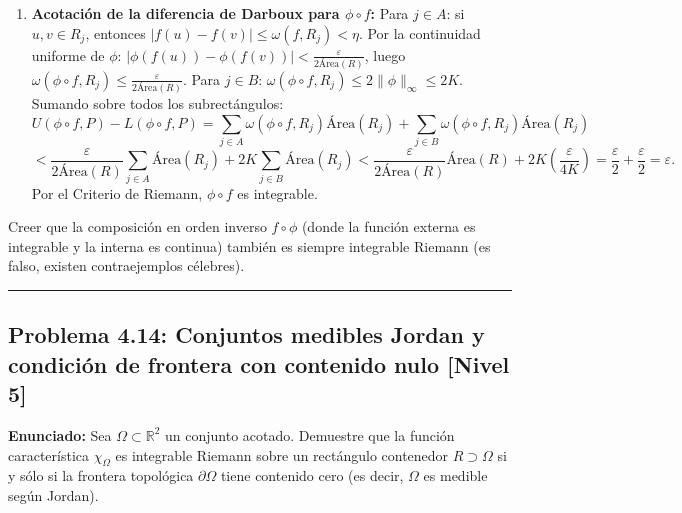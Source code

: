 \documentclass[11pt,a4paper]{article}
\begin{document}
\begin{enumerate}[label=\textbf{\arabic*.}]
\item \textbf{Acotación de la diferencia de Darboux para $\phi \circ f$:}
Para $j \in A$: si $u, v \in R_j$, entonces $|f(u) - f(v)| \le \omega(f, R_j) < \eta$.
Por la continuidad uniforme de $\phi$: $|\phi(f(u)) - \phi(f(v))| < \frac{\varepsilon}{2\text{Área}(R)}$, luego $\omega(\phi \circ f, R_j) \le \frac{\varepsilon}{2\text{Área}(R)}$.
Para $j \in B$: $\omega(\phi \circ f, R_j) \le 2\|\phi\|_\infty \le 2K$.
Sumando sobre todos los subrectángulos:
\begin{equation*}
U(\phi \circ f, P) - L(\phi \circ f, P) = \sum_{j \in A} \omega(\phi \circ f, R_j)\text{Área}(R_j) + \sum_{j \in B} \omega(\phi \circ f, R_j)\text{Área}(R_j)
\end{equation*}
\begin{equation*}
< \frac{\varepsilon}{2\text{Área}(R)} \sum_{j \in A} \text{Área}(R_j) + 2K \sum_{j \in B} \text{Área}(R_j) < \frac{\varepsilon}{2\text{Área}(R)} \text{Área}(R) + 2K \left(\frac{\varepsilon}{4K}\right) = \frac{\varepsilon}{2} + \frac{\varepsilon}{2} = \varepsilon.
\end{equation*}
Por el Criterio de Riemann, $\phi \circ f$ es integrable.
\end{enumerate}

\begin{trapbox}
Creer que la composición en orden inverso $f \circ \phi$ (donde la función externa es integrable y la interna es continua) también es siempre integrable Riemann (es falso, existen contraejemplos célebres).
\end{trapbox}

\vspace{0.5cm}
\hrule
\vspace{0.5cm}

\subsection*{Problema 4.14: Conjuntos medibles Jordan y condición de frontera con contenido nulo \hfill \color{primaryblue}\small[Nivel 5]}

\begin{tcolorbox}[colback=white,colframe=gray!40,arc=1mm,boxrule=0.5pt,left=3mm,right=3mm,top=2mm,bottom=2mm]
\textbf{Enunciado:} Sea $\Omega \subset \mathbb{R}^2$ un conjunto acotado. Demuestre que la función característica $\chi_\Omega$ es integrable Riemann sobre un rectángulo contenedor $R \supset \Omega$ si y sólo si la frontera topológica $\partial \Omega$ tiene contenido cero (es decir, $\Omega$ es medible según Jordan).
\end{tcolorbox}
\end{document}

